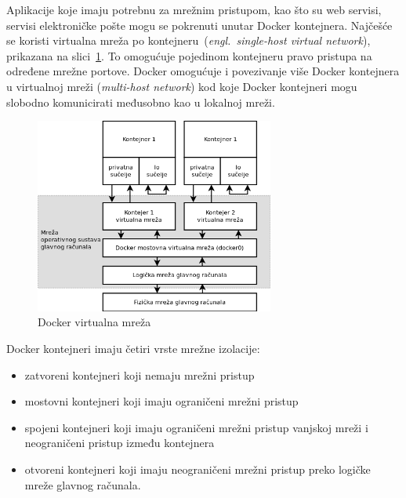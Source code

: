 Aplikacije koje imaju potrebnu za mrežnim pristupom, kao što su web servisi, servisi elektroničke
pošte mogu se pokrenuti unutar Docker kontejnera. Najčešće se koristi virtualna mreža po
kontejneru~(\textit{engl.~single-host virtual network}), prikazana na
slici~\ref{fig:02docker_networking}. To omogućuje pojedinom kontejneru pravo
pristupa na određene mrežne portove. Docker omogućuje i povezivanje više Docker kontejnera u
virtualnoj mreži (\textit{multi-host network}) kod koje Docker kontejneri mogu slobodno komunicirati
međusobno kao u lokalnoj mreži.

\begin{figure}[h]
    \centering
    \includegraphics[width=0.7\textwidth]{img/02/docker_networking.png}
    \caption{Docker virtualna mreža}%
    \label{fig:02docker_networking}
\end{figure}

Docker kontejneri imaju četiri vrste mrežne izolacije:

\begin{itemize}
        \item zatvoreni kontejneri koji  nemaju mrežni pristup
        \item mostovni kontejneri koji imaju ograničeni mrežni pristup
        \item spojeni kontejneri koji imaju ograničeni mrežni pristup vanjskoj mreži i
            neograničeni pristup između kontejnera
        \item otvoreni kontejneri koji imaju neograničeni mrežni pristup preko logičke mreže glavnog
            računala.
\end{itemize}

